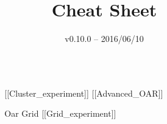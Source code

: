 \documentclass[final]{beamer}
\title{Cheat Sheet} %
\author{v0.10.0 -- 2016/06/10} %
\institute{\url{http://grid5000.fr/}} %
\newlength{\sepwid}
\newlength{\onecolwid}
\begin{document}

\setlength{\belowcaptionskip}{2ex} %
\setlength\belowdisplayshortskip{2ex} %

\begin{frame}[t] %

\begin{columns}[t] %

\begin{column}{\sepwid}\end{column} %

\begin{column}{\onecolwid} %


\begin{alertblock}{[[Cluster\_experiment]]     [[Advanced\_OAR]]}

\end{alertblock}



\begin{alertblock}{Oar Grid [[Grid\_experiment]]}

\end{alertblock}


\end{column} %

\begin{column}{\sepwid}\end{column} %


\end{columns}
\end{frame}
\end{document}
